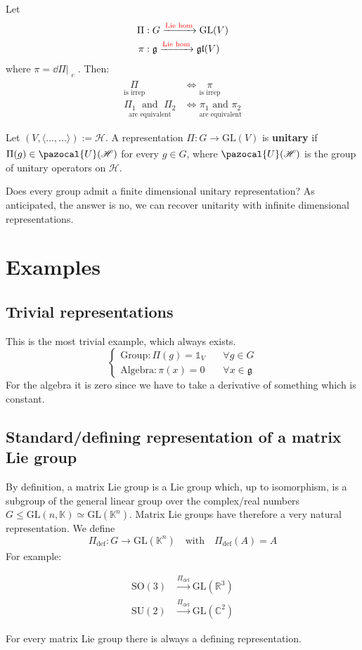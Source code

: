 \documentclass[../main.tex]{subfiles}
\begin{document}
\begin{proposition}Let
\begin{align*}
    \Pi&:G\xrightarrow[]{{\color{red}\text{Lie hom}}}\text{GL}(V)\\
    \pi&:\mathfrak{g}\xrightarrow[]{{\color{red}\text{Lie hom}}}\mathfrak{gl}(V)
\end{align*}
where $\pi=\dd\Pi\Bigr|_{\substack{e}}$. Then:
\[
\begin{split}
\underset{\text{is irrep}}{\Pi}&\Longleftrightarrow\underset{\text{is irrep}}{\pi}\\
\underset{\text{are equivalent}}{\Pi_1\;\text{ and }\;\Pi_2}&\Longleftrightarrow\underset{\text{are equivalent}}{\pi_1\text{ and }\pi_2}
\end{split}
\]
\end{proposition}
\begin{definition}
Let $(V,\langle\dots,\dots\rangle):=\mathcal{H}$. A representation $\Pi:G\xrightarrow[]{}\text{GL}(V)$ is \textbf{unitary} if $\Pi(g)\in\pazocal{U}(\mathcal{H})$ for every $g\in G$, where $\pazocal{U}(\mathcal{H})$ is the group of unitary operators on $\mathcal{H}$.
\end{definition}
Does every group admit a finite dimensional unitary representation? As anticipated, the answer is no, we can recover unitarity with infinite dimensional representations.
\section{Examples}
\subsection{Trivial representations}
This is the most trivial example, which always exists.
\[
\begin{cases}
\text{Group}: \Pi(g)=\mathbb{1}_V \quad &\forall g\in G\\
\text{Algebra}: \pi(x)=0 \quad &\forall x\in\mathfrak{g}
\end{cases}
\]
For the algebra it is zero since we have to take a derivative of something which is constant.
\subsection{Standard/defining representation of a matrix Lie group}
By definition, a matrix Lie group is a Lie group which, up to isomorphism, is a subgroup of the general linear group over the complex/real numbers $G\le\textrm{GL}(n,\mathbb{K})\simeq\textrm{GL}(\mathbb{K}^n)$. Matrix Lie groups have therefore a very natural representation. We define \[
\Pi_{\text{def}}:G\xrightarrow[]{}\text{GL}(\mathbb{K}^n)\quad  \text{with}\quad  \Pi_{\text{def}}(A)=A
\]
For example:
\begin{example}
\begin{align*}
    \text{SO}(3)&\xrightarrow[]{\Pi_{\text{def}}}\text{GL}(\mathbb{R}^3)\\
    \text{SU}(2)&\xrightarrow[]{\Pi_{\text{def}}}\text{GL}(\mathbb{C}^2)
\end{align*}
\end{example}
For every matrix Lie group there is always a defining representation.
\end{document}
